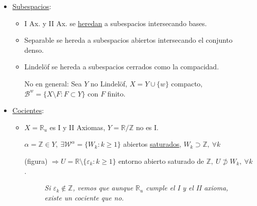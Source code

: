 \begin{demo}
\begin{itemize}
    \item \underline{Subespacios}:
    \begin{itemize}
        \item I Ax. y II Ax. se \underline{heredan} a subespacios intersecando bases.
        \item Separable se hereda a subespacios abiertos intersecando el conjunto denso.
        \item Lindelöf se hereda a subespacios cerrados como la compacidad. 

        No en general: Sea $Y$ no Lindelöf, $X = Y \cup \{w\}$ compacto, $\mathcal{B}^w = \{X \setminus F: F \subset Y\}$ con $F$ finito.    
    \end{itemize}

    \item \underline{Cocientes}:
    \begin{itemize}
        \item $X = \mathbb{R}_u$ es I y II Axiomas, $Y = \mathbb{R}/\mathbb{Z}$ no es I.
        \begin{demo}
            $\alpha = \mathbb{Z} \in Y,\ \exists \mathcal{W}^{\alpha} = \{W_k : k \ge 1\}$ abiertos \underline{saturados}, $W_k \supset \mathbb{Z},\ \forall k$

            (figura) $\Rightarrow U = \mathbb{R} \setminus \{\varepsilon_k : k \ge 1\}$ entorno abierto saturado de $\mathbb{Z},\ U \not \supset W_k,\ \forall k$.

        \begin{figure}[H]
            \centering
            \caption{\textit{Si $\varepsilon_k \not\in \mathbb{Z}$, vemos que aunque $\mathbb{R}_u$ cumple el I y el II axioma, existe un cociente que no.}}
            \label{fig:I_ax_II_ax_cocientes}
        \end{figure}
        \end{demo}


\end{itemize}
\end{itemize}
\end{demo}
